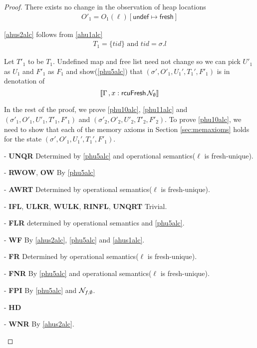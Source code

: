 \begin{proof}
There exists no change in the observation of heap locations
\begin{gather}\label{ahus1alc}
  O'_1 =  O_1(\ell)[\textsf{undef}\mapsto \textsf{fresh}]
\end{gather}

\ref{ahus2alc} follows from \ref{ahu1alc}
\begin{gather}\label{ahus2alc}
  T_1 = \{tid\} \text{ and } tid = \sigma.l
\end{gather}

Let $T'_1$ to be $T_1$. Undefined map and free list need not change so we can pick $U'_1$ as $U_1$ and $F'_1$ as $F_1$ and show(\ref{phu5alc}) that $(\sigma',O'_1,U_1',T_1',F'_1)$ is in denotation of
\[\llbracket \Gamma\,,  x:\textsf{rcuFresh} \, \mathcal{N}_{\emptyset}  \rrbracket \]

In the rest of the proof, we prove \ref{phu10alc}, \ref{phu11alc} and $(\sigma'_1, O'_1, U'_1,T'_1,F'_1)$ and  $(\sigma'_2, O'_2, U'_2,T'_2,F'_2)$. To prove \ref{phu10alc}, we need to show that each of the memory axioms in Section \ref{sec:memaxioms} holds for the state $(\sigma',O'_1,U_1',T_1',F'_1)$.

\begin{case} - \textbf{UNQR} Determined by \ref{phu5alc} and operational semantics($\ell$ is fresh-unique).
\end{case}
\begin{case} - \textbf{RWOW}, \textbf{OW} By \ref{phu5alc}
\end{case}
\begin{case} - \textbf{AWRT} Determined by operational semantics($\ell$ is fresh-unique). 
\end{case}
\begin{case} - \textbf{IFL}, \textbf{ULKR}, \textbf{WULK}, \textbf{RINFL}, \textbf{UNQRT} Trivial.
\end{case}
\begin{case} - \textbf{FLR} determined by operational semantics and \ref{phu5alc}.
\end{case}
\begin{case} - \textbf{WF} By \ref{ahus2alc}, \ref{phu5alc} and \ref{ahus1alc}. 
\end{case}
\begin{case} - \textbf{FR} Determined by operational semantics($\ell$ is fresh-unique).
\end{case}
\begin{case} - \textbf{FNR} By \ref{phu5alc} and operational semantics($\ell$ is fresh-unique).
\end{case}
\begin{case} - \textbf{FPI} By \ref{phu5alc} and $\mathcal{N}_{f,\emptyset}$.
\end{case} 
\begin{case} - \textbf{HD} 
\end{case}
\begin{case} - \textbf{WNR} By \ref{ahus2alc}.
\end{case}


\end{proof}
